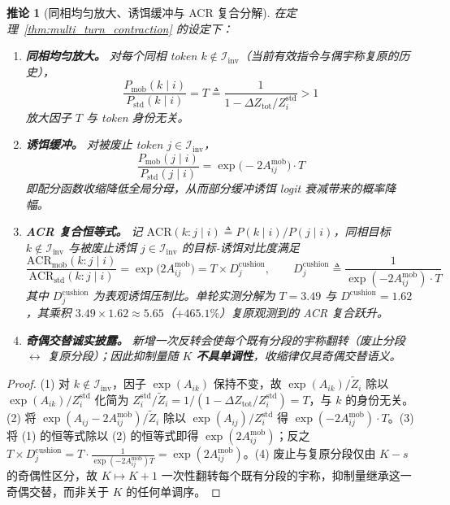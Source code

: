 \documentclass[11pt,a4paper]{article}
\newtheorem{corollary}[theorem]{推论}
\theoremstyle{definition}
\begin{document}
\begin{corollary}[同相均匀放大、诱饵缓冲与 ACR 复合分解]
\label{cor:k_turn_acr}
在定理~\ref{thm:multi_turn_contraction} 的设定下：
\begin{enumerate}
    \item \textbf{同相均匀放大。} 对每个同相 token $k \notin \mathcal{I}_{\text{inv}}$（当前有效指令与偶宇称复原的历史），
    \begin{equation}
    \frac{P_{\mathrm{mob}}(k \mid i)}{P_{\mathrm{std}}(k \mid i)} = T \triangleq \frac{1}{1 - \Delta Z_{\text{tot}}/Z_i^{\mathrm{std}}} > 1
    \end{equation}
    放大因子 $T$ 与 token 身份无关。
    \item \textbf{诱饵缓冲。} 对被废止 token $j \in \mathcal{I}_{\text{inv}}$，
    \begin{equation}
    \frac{P_{\mathrm{mob}}(j \mid i)}{P_{\mathrm{std}}(j \mid i)} = \exp\big(-2A_{ij}^{\text{mob}}\big) \cdot T
    \end{equation}
    即配分函数收缩降低全局分母，从而部分缓冲诱饵 logit 衰减带来的概率降幅。
    \item \textbf{ACR 复合恒等式。} 记 $\mathrm{ACR}(k : j \mid i) \triangleq P(k \mid i)/P(j \mid i)$，同相目标 $k \notin \mathcal{I}_{\text{inv}}$ 与被废止诱饵 $j \in \mathcal{I}_{\text{inv}}$ 的目标-诱饵对比度满足
    \begin{equation}
    \frac{\mathrm{ACR}_{\mathrm{mob}}(k : j \mid i)}{\mathrm{ACR}_{\mathrm{std}}(k : j \mid i)} = \exp\big(2A_{ij}^{\text{mob}}\big) = T \times D_j^{\text{cushion}}, \qquad D_j^{\text{cushion}} \triangleq \frac{1}{\exp(-2A_{ij}^{\text{mob}}) \cdot T}
    \end{equation}
    其中 $D_j^{\text{cushion}}$ 为表观诱饵压制比。单轮实测分解为 $T = 3.49$ 与 $D^{\text{cushion}} = 1.62$，其乘积 $3.49 \times 1.62 \approx 5.65$（$+465.1\%$）复原观测到的 ACR 复合跃升。
    \item \textbf{奇偶交替诚实披露。} 新增一次反转会使每个既有分段的宇称翻转（废止分段 $\leftrightarrow$ 复原分段）；因此抑制量随 $K$ \textbf{不具单调性}，收缩律仅具奇偶交替语义。
\end{enumerate}
\end{corollary}
\begin{proof}
(1) 对 $k \notin \mathcal{I}_{\text{inv}}$，因子 $\exp(A_{ik})$ 保持不变，故 $\exp(A_{ik})/\tilde{Z}_i$ 除以 $\exp(A_{ik})/Z_i^{\mathrm{std}}$ 化简为 $Z_i^{\mathrm{std}}/\tilde{Z}_i = 1/(1 - \Delta Z_{\text{tot}}/Z_i^{\mathrm{std}}) = T$，与 $k$ 的身份无关。(2) 将 $\exp(A_{ij} - 2A_{ij}^{\text{mob}})/\tilde{Z}_i$ 除以 $\exp(A_{ij})/Z_i^{\mathrm{std}}$ 得 $\exp(-2A_{ij}^{\text{mob}}) \cdot T$。(3) 将 (1) 的恒等式除以 (2) 的恒等式即得 $\exp(2A_{ij}^{\text{mob}})$；反之 $T \times D_j^{\text{cushion}} = T \cdot \frac{1}{\exp(-2A_{ij}^{\text{mob}}) T} = \exp(2A_{ij}^{\text{mob}})$。(4) 废止与复原分段仅由 $K - s$ 的奇偶性区分，故 $K \mapsto K + 1$ 一次性翻转每个既有分段的宇称，抑制量继承这一奇偶交替，而非关于 $K$ 的任何单调序。
\end{proof}
\end{document}

